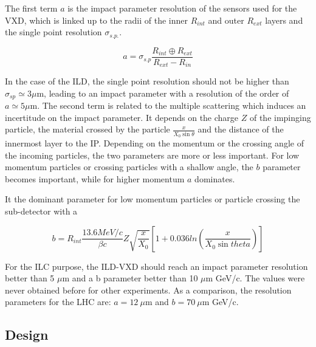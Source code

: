    The first term $a$ is the impact parameter resolution of the sensors used for the \gls{VXD}, which is linked up to the radii of the inner $R_{int}$ and outer $R_{ext}$ layers and the single point resolution $\sigma_{s.p.}$.

   \begin{equation}
     a = \sigma_{s.p}\frac{R_{int} \oplus R_{ext}}{R_{ext} - R_{in}}
   \end{equation}

    In the case of the \gls{ILD}, the single point resolution should not be higher than $\sigma_{sp} \simeq 3 \mu\text{m}$, leading to an impact parameter with a resolution of the order of $a \simeq 5 \mu\text{m}$.
    The second term is related to the multiple scattering which induces an incertitude on the impact parameter.
    It depends on the charge $Z$ of the impinging particle, the material crossed by the particle $\frac{x}{X_0 \sin{\theta}}$ and the distance of the innermost layer to the \gls{IP}.
    Depending on the momentum or the crossing angle of the incoming particles, the two parameters are more or less important.
    For low momentum particles or crossing particles with a shallow angle, the $b$ parameter becomes important, while for higher momentum $a$ dominates.

    It the dominant parameter for low momentum particles or particle crossing the sub-detector with a 

    \begin{equation}
      b = R_{int} \frac{13.6 MeV/c}{\beta c}  Z \sqrt{\frac{x}{X_{0}}} \left[ 1 + 0.036 ln \left( \frac{x}{X_{0}\sin{theta}} \right) \right]
    \end{equation}
   
   For the \gls{ILC} purpose, the \gls{ILD}-\gls{VXD} should reach an impact parameter resolution better than 5 $\mu$m and a b parameter better than 10 $\mu$m GeV/c. 
   The values were never obtained before for other experiments. 
   As a comparison, the resolution parameters for the \gls{LHC} are: $a =  12 \ \mu$m and $b = 70 \ \mu$m GeV/c. 

   \subsection{Design}

